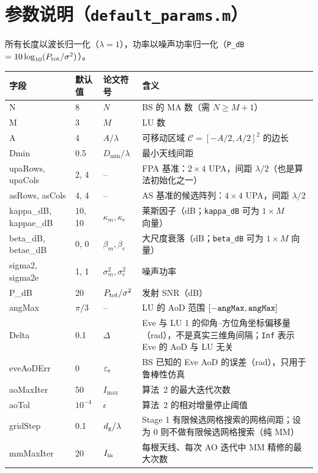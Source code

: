 \documentclass[11pt,a4paper]{ctexart}
\newcommand{\code}[1]{\texttt{#1}}
\newcommand{\Ptot}{P_{\rm tot}}
\begin{document}
\section{参数说明（\code{default\_params.m}）}\label{sec:prm}
所有长度以波长归一化（$\lambda=1$），功率以噪声功率归一化（\code{P\_dB} $=10\log_{10}(\Ptot/\sigma^2)$）。
\begin{longtable}{>{\ttfamily}p{2.5cm}p{1.6cm}p{2.0cm}p{8.9cm}}
\toprule
字段 & 默认值 & 论文符号 & 含义 \\ \midrule
N & 8 & $N$ & BS 的 MA 数（需 $N\ge M+1$）\\
M & 3 & $M$ & LU 数 \\
A & 4 & $A/\lambda$ & 可移动区域 $\mathcal C=[-A/2,A/2]^2$ 的边长 \\
Dmin & 0.5 & $D_{\min}/\lambda$ & 最小天线间距 \\
upaRows, upaCols & 2, 4 & -- & FPA 基准：$2\times4$ UPA，间距 $\lambda/2$（也是算法初始化之一）\\
asRows, asCols & 4, 4 & -- & AS 基准的候选阵列：$4\times4$ UPA，间距 $\lambda/2$ \\
kappa\_dB, kappae\_dB & 10, 10 & $\kappa_m,\kappa_e$ & 莱斯因子（dB；\code{kappa\_dB} 可为 $1\times M$ 向量）\\
beta\_dB, betae\_dB & 0, 0 & $\beta_m,\beta_e$ & 大尺度衰落（dB；\code{beta\_dB} 可为 $1\times M$ 向量）\\
sigma2, sigma2e & 1, 1 & $\sigma_m^2,\sigma_e^2$ & 噪声功率 \\
P\_dB & 20 & $\Ptot/\sigma^2$ & 发射 SNR（dB）\\
angMax & $\pi/3$ & -- & LU 的 AoD 范围 $[-{\tt angMax},{\tt angMax}]$ \\
Delta & 0.1 & $\Delta$ & Eve 与 LU 1 的仰角--方位角坐标偏移量（rad），不是真实三维角间隔；\code{Inf} 表示 Eve 的 AoD 与 LU 无关 \\
eveAoDErr & 0 & $\varepsilon_{\rm e}$ & BS 已知的 Eve AoD 的误差（rad），只用于鲁棒性仿真 \\ \midrule
aoMaxIter & 50 & $I_{\max}$ & 算法~2 的最大迭代次数 \\
aoTol & $10^{-4}$ & $\epsilon$ & 算法~2 的相对增量停止阈值 \\
gridStep & 0.1 & $d_{\rm g}/\lambda$ & Stage 1 有限候选网格搜索的网格间距；设为 0 则不做有限候选网格搜索（纯 MM）\\
mmMaxIter & 20 & $I_{\rm in}$ & 每根天线、每次 AO 迭代中 MM 精修的最大次数 \\

\end{longtable}
\end{document}
